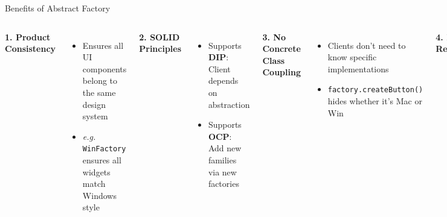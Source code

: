 \documentclass[aspectratio=169, table]{beamer}
\begin{document}
\begin{frame}[fragile]{Benefits of Abstract Factory}
\vspace{5pt}
\begin{columns}[T]
\textbf{1. Product Consistency}
\begin{itemize}
\item Ensures all UI components belong to the same design system
\item \textit{e.g.} \texttt{WinFactory} ensures all widgets match Windows style
\end{itemize}

\textbf{2. SOLID Principles}
\begin{itemize}
\item Supports \textbf{DIP}: Client depends on abstraction
\item Supports \textbf{OCP}: Add new families via new factories
\end{itemize}

\textbf{3. No Concrete Class Coupling}
\begin{itemize}
\item Clients don’t need to know specific implementations
\item \texttt{factory.createButton()} hides whether it’s Mac or Win
\end{itemize}

\textbf{4. Easy Reconfiguration}
\begin{itemize}
\item Switch entire look-and-feel with one factory instance
\item \textit{e.g.} switch to \texttt{DarkThemeFactory} to enable dark mode
\end{itemize}
\end{columns}
\end{frame}
\end{document}
